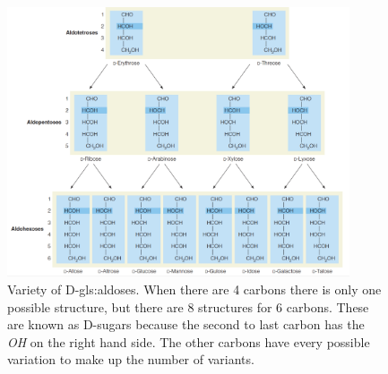 \documentclass[]{article}
\begin{document}
\begin{figure}[H]
	\caption[Variety of D-\glspl{gls:aldose}]{Variety of D-\glspl{gls:aldose}. When there are 4 carbons there is only one possible structure, but there are 8 structures for 6 carbons. These are known as D-sugars because the second to last carbon has the \emph{OH} on the right hand side. The other carbons have every possible variation to make up the number of variants.}\label{fig:SugarsStructure} 
	\includegraphics[width=0.9\textwidth]{SugarsStructure}
\end{figure}
\end{document}
